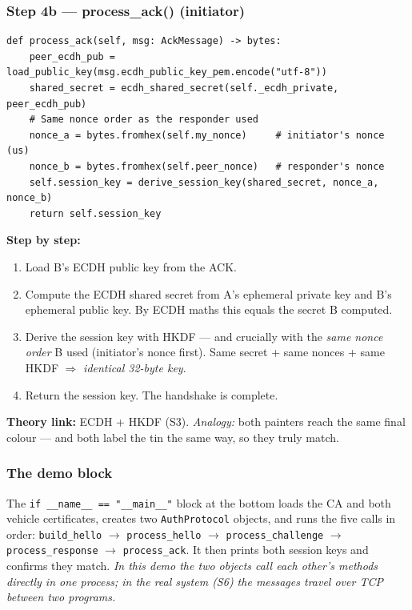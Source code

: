 \documentclass[11pt,a4paper]{report}
\begin{document}
\subsubsection*{Step 4b --- process\_ack() (initiator)}
\begin{lstlisting}[style=py,caption={auth\_protocol.py --- Step 4b: process ACK, derive the matching key.}]
def process_ack(self, msg: AckMessage) -> bytes:
    peer_ecdh_pub = load_public_key(msg.ecdh_public_key_pem.encode("utf-8"))
    shared_secret = ecdh_shared_secret(self._ecdh_private, peer_ecdh_pub)
    # Same nonce order as the responder used
    nonce_a = bytes.fromhex(self.my_nonce)     # initiator's nonce (us)
    nonce_b = bytes.fromhex(self.peer_nonce)   # responder's nonce
    self.session_key = derive_session_key(shared_secret, nonce_a, nonce_b)
    return self.session_key
\end{lstlisting}
\textbf{Step by step:}
\begin{enumerate}
  \item Load B's ECDH public key from the ACK.
  \item Compute the ECDH shared secret from A's ephemeral private key and B's
        ephemeral public key. By ECDH maths this equals the secret B computed.
  \item Derive the session key with HKDF --- and crucially with the \emph{same
        nonce order} B used (initiator's nonce first). Same secret + same nonces
        + same HKDF $\Rightarrow$ \emph{identical 32-byte key}.
  \item Return the session key. The handshake is complete.
\end{enumerate}
\textbf{Theory link:} ECDH + HKDF (S3). \emph{Analogy:} both painters reach the
same final colour --- and both label the tin the same way, so they truly match.

\subsubsection*{The demo block}
The \texttt{if \_\_name\_\_ == "\_\_main\_\_"} block at the bottom loads the CA
and both vehicle certificates, creates two \texttt{AuthProtocol} objects, and
runs the five calls in order: \texttt{build\_hello} $\to$ \texttt{process\_hello}
$\to$ \texttt{process\_challenge} $\to$ \texttt{process\_response} $\to$
\texttt{process\_ack}. It then prints both session keys and confirms they match.
\emph{In this demo the two objects call each other's methods directly in one
process; in the real system (S6) the messages travel over TCP between two
programs.}
\end{document}
